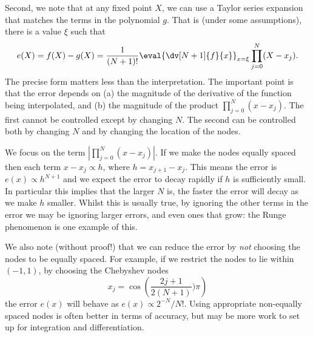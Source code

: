Second, we note that at any fixed point $X$, we can use a Taylor series expansion that matches the terms in the polynomial $g$. That is (under some assumptions), there is a value $\xi$ such that
%
\begin{equation}
  e(X) = f(X) - g(X) = \frac{1}{(N+1)!} \eval{\dv[N+1]{f}{x}}_{x=\xi} \prod_{j=0}^N (X - x_j).
\end{equation}
%
The precise form matters less than the interpretation. The important point is that the error depends on (a) the magnitude of the derivative of the function being interpolated, and (b) the magnitude of the product $\prod_{j=0}^N (x - x_j)$. The first cannot be controlled except by changing $N$. The second can be controlled both by changing $N$ and by changing the location of the nodes.

We focus on the term $|\prod_{j=0}^N (x - x_j)|$. If we make the nodes equally spaced then each term $x - x_j \propto h$, where $h = x_{j+1} - x_j$. This means the error is $e(x) \propto h^{N+1}$ and we expect the error to decay rapidly if $h$ is sufficiently small. In particular this implies that the larger $N$ is, the faster the error will decay as we make $h$ smaller. Whilst this is usually true, by ignoring the other terms in the error we may be ignoring larger errors, and even ones that grow: the Runge phenomenon is one example of this.

We also note (without proof!) that we can reduce the error by \emph{not} choosing the nodes to be equally spaced. For example, if we restrict the nodes to lie within $(-1, 1)$, by choosing the Chebyshev nodes
%
\begin{equation}
  x_j = \cos \left( \frac{2 j + 1}{2 (N + 1)}) \pi \right)
\end{equation}
%
the error $e(x)$ will behave as $e(x) \propto 2^{-N} / N!$. Using appropriate non-equally spaced nodes is often better in terms of accuracy, but may be more work to set up for integration and differentiation.
